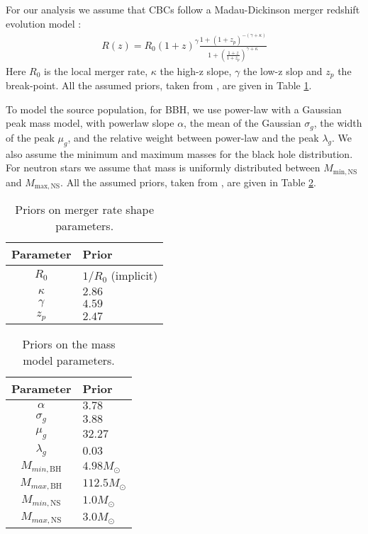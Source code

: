 For our analysis we assume that \acp{CBC} follow a Madau-Dickinson merger redshift evolution model \citep{madau2014cosmic}:
\begin{align}
    R(z) = R_0(1+z)^{\gamma}\frac{1+(1+z_p)^{-(\gamma+\kappa)}}{1+\left( \frac{1+z}{1+z_p}\right)^{\gamma + \kappa}}
\end{align}
Here $R_0$ is the local merger rate, $\kappa$ the high-z slope, $\gamma$ the low-z slop and $z_p$ the break-point. All the assumed priors, taken from \citet{abbott2023gwtc}, are given in Table \ref{tab:Madau}.

To model the source population, for \ac{BBH}, we use power-law with a Gaussian peak mass model, with powerlaw slope $\alpha$, the mean of the Gaussian $\sigma_g$, the width of the peak $\mu_g$, and the relative weight between power-law and the peak $\lambda_g$. We also assume the minimum and maximum masses for the black hole distribution. For neutron stars we assume that mass is uniformly distributed between $M_{\mathrm{min, NS}}$ and $M_{\mathrm{max, NS}}$. All the assumed priors, taken from \citet{abbott2023gwtc}, are given in Table \ref{tab:mass_dist}.

\begin{table}[h!]
    \small
    \centering
    \caption{Priors on merger rate shape parameters.}
    \label{tab:Madau}
    \begin{tabular}{c l}
        \hline
        \textbf{Parameter} & \textbf{Prior} \\
        \hline
         $R_0$ & $1/R_0$ (implicit) \\
         $\kappa$ & $2.86$ \\
         $\gamma$ & $4.59$ \\
         $z_p$ & $2.47$ \\
         \hline
    \end{tabular}
\end{table}

\begin{table}[h!]
    \small
    \centering
    \caption{Priors on the mass model parameters.}
    \label{tab:mass_dist}
    \begin{tabular}{c l}
        \hline
        \textbf{Parameter} & \textbf{Prior} \\
        \hline
         $\alpha$ & $3.78$ \\
         $\sigma_g$ & $3.88$ \\
         $\mu_g$ & $32.27$ \\
         $\lambda_g$ & $0.03$ \\
         $M_{min,\mathrm{BH}}$ & $4.98M_{\odot}$ \\
         $M_{max,\mathrm{BH}}$ & $112.5M_{\odot}$ \\
         $M_{min,\mathrm{NS}}$ & $1.0M_{\odot}$ \\
         $M_{max,\mathrm{NS}}$ & $3.0M_{\odot}$ \\
         \hline
    \end{tabular}
\end{table}

